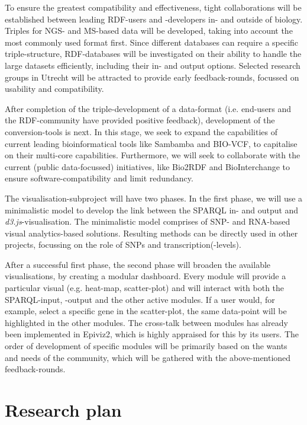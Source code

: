 \documentclass[twoside,fontsize=10pt]{article}
\begin{document}
\noindent
To ensure the greatest compatibility and effectiveness, tight collaborations will be established between leading RDF-users and -developers in- and outside of biology. Triples for NGS- and MS-based data will be developed, taking into account the most commonly used format first. Since different databases can require a specific triple-structure, RDF-databases will be investigated on their ability to handle the large datasets efficiently, including their in- and output options. Selected research groups in Utrecht will be attracted to provide early feedback-rounds, focussed on usability and compatibility. 

After completion of the triple-development of a data-format (i.e. end-users and the RDF-community have provided positive feedback), development of the conversion-tools is next. In this stage, we seek to expand the capabilities of current leading bioinformatical tools like Sambamba\cite{Tarasov2014} and BIO-VCF\cite{Goto2010}, to capitalise on their multi-core capabilities. Furthermore, we will seek to collaborate with the current (public data-focussed) initiatives, like Bio2RDF\cite{Belleau2008} and BioInterchange\cite{Baran} to ensure software-compatibility and limit redundancy.
\medskip

\noindent
The visualisation-subproject will have two phases. In the first phase, we will use a minimalistic model to develop the link between the SPARQL in- and output and \textit{d3.js}-visualisation. The minimalistic model comprises of SNP- and RNA-based visual analytics-based solutions. Resulting methods can be directly used in other projects, focussing on the role of SNPs and transcription(-levels).

After a successful first phase, the second phase will broaden the available visualisations, by creating a modular dashboard. Every module will provide a particular visual (e.g. heat-map, scatter-plot) and will interact with both the SPARQL-input, -output and the other active modules. If a user would, for example, select a specific gene in the scatter-plot, the same data-point will be highlighted in the other modules. The cross-talk between modules has already been implemented in Epiviz2\cite{Chelaru2014}, which is highly appraised for this by its users. The order of development of specific modules will be primarily based on the wants and needs of the community, which will be gathered with the above-mentioned feedback-rounds.
\section*{Research plan}
\end{document}
